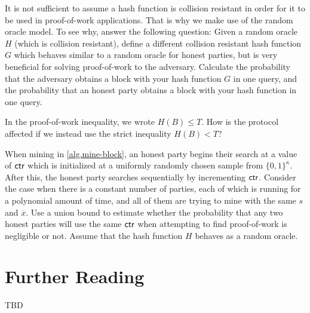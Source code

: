\begin{problems}
  \item It is not sufficient to assume a hash function is collision resistant in order
  for it to be used in proof-of-work applications. That is why we make use of
  the random oracle model. To see why, answer the following question:
  Given a random oracle $H$ (which is collision resistant), define a different
  collision resistant hash function $G$ which behaves similar to a random oracle
  for honest parties, but is very beneficial for solving proof-of-work
  to the adversary. Calculate the probability that the adversary obtains a
  block with your hash function $G$ in one query, and the probability that
  an honest party obtains a block with your hash function in one query.\label{problem.small-hash}

  \item In the proof-of-work inequality, we wrote $H(B) \leq T$.
  How is the protocol affected if we instead use the strict inequality $H(B) < T$?

  \item When mining in \cref{alg.mine-block}, an honest party begins their search at a
        value of $\mathsf{ctr}$ which is initialized at a uniformly randomly chosen sample from $\{0, 1\}^\kappa$.
        After this, the honest party searches sequentially by incrementing $\mathsf{ctr}$.
        Consider the case when there is a constant number of parties, each of which is running for a
        polynomial amount of time, and all of them are trying to mine with the same $s$ and $\overline{x}$.
        Use a union bound to estimate whether the probability that any two honest parties will use
        the same $\mathsf{ctr}$ when attempting to find proof-of-work is negligible or not.
        Assume that the hash function $H$ behaves as a random oracle.
\end{problems}

\section*{Further Reading}

TBD
